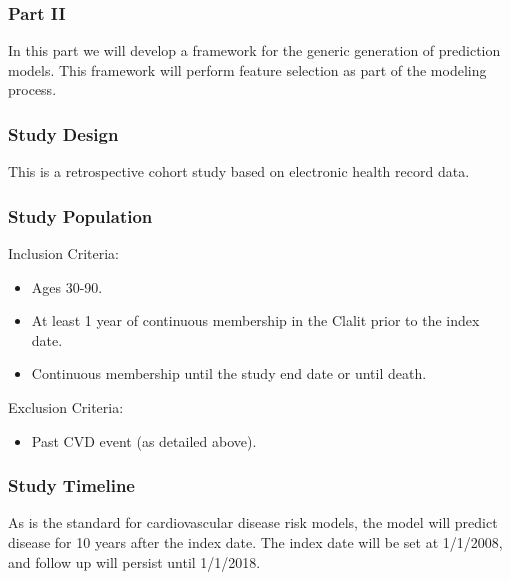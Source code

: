 \documentclass[a4paper,12pt]{article}
\begin{document}
		\subsubsection{Part II}
		In this part we will develop a framework for the generic generation of prediction models. This framework will perform feature selection as part of the modeling process.
		
		\subsubsection*{Study Design}
		This is a retrospective cohort study based on electronic health record data.
		
		\subsubsection*{Study Population}
		Inclusion Criteria:
		\begin{itemize}
			\item Ages 30-90.
			\item At least 1 year of continuous membership in the Clalit prior to the index date.
			\item Continuous membership until the study end date or until death.
		\end{itemize}
		
		Exclusion Criteria:
		\begin{itemize}
			\item Past CVD event (as detailed above).
		\end{itemize}
		
		\subsubsection*{Study Timeline}
		As is the standard for cardiovascular disease risk models, the model will predict disease for 10 years after the index date. The index date will be set at 1/1/2008, and follow up will persist until 1/1/2018.
		
\end{document}
